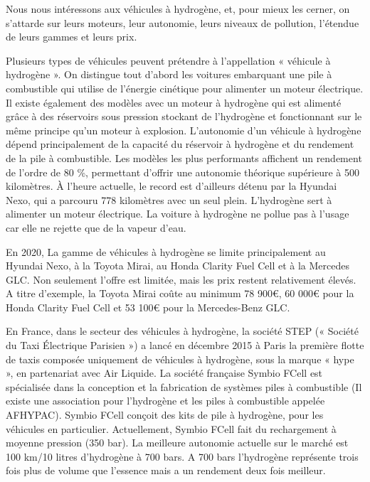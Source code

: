  Nous nous intéressons aux véhicules à hydrogène, et, pour mieux les cerner, on s'attarde sur leurs moteurs, leur autonomie, leurs niveaux de pollution, l'étendue de leurs gammes et leurs prix.
 
 Plusieurs types de véhicules peuvent prétendre à l'appellation « véhicule à hydrogène ». On distingue tout d'abord les voitures embarquant une pile à combustible qui utilise de l'énergie cinétique pour alimenter un moteur électrique. Il existe également des modèles avec un moteur à hydrogène qui est alimenté grâce à des réservoirs sous pression stockant de l'hydrogène et fonctionnant sur le même principe qu'un moteur à explosion.
 L'autonomie d'un véhicule à hydrogène dépend principalement de la capacité du réservoir à hydrogène et du rendement de la pile à combustible. Les modèles les plus performants affichent un rendement de l'ordre de 80 \%, permettant d'offrir une autonomie théorique supérieure à 500 kilomètres. À l'heure actuelle, le record est d'ailleurs détenu par la Hyundai Nexo, qui a parcouru 778 kilomètres avec un seul plein.
 L'hydrogène sert à alimenter un moteur électrique.
La voiture à hydrogène ne pollue pas à l'usage car elle ne rejette que de la vapeur d'eau.
 
  En 2020, La gamme de véhicules à hydrogène se limite principalement au Hyundai Nexo, à la Toyota Mirai, au Honda Clarity Fuel Cell et à la Mercedes GLC.
 Non seulement l'offre est limitée, mais les prix restent relativement élevés. A titre d'exemple, la Toyota Mirai coûte au minimum 78 900\euro{}, 60 000\euro{} pour la Honda Clarity Fuel Cell et 53 100\euro{} pour la Mercedes-Benz GLC.
 
 En France, dans le secteur des véhicules à hydrogène, la société
 STEP (« Société du Taxi Électrique Parisien ») a lancé en décembre 2015 à Paris la première flotte de taxis composée uniquement de véhicules à hydrogène, sous la marque « hype », en partenariat avec 
 Air Liquide. La société française  Symbio FCell est spécialisée dans la conception et la fabrication de systèmes piles à combustible (Il existe une association pour l'hydrogène et les piles à combustible appelée %
 AFHYPAC). Symbio FCell conçoit des kits de pile à hydrogène, pour les véhicules en particulier. Actuellement, Symbio FCell fait du rechargement à moyenne pression (350 bar).
 La meilleure autonomie actuelle sur le marché est 100 km/10 litres d'hydrogène à 700 bars.  A 700 bars l'hydrogène représente trois fois plus de volume que l'essence mais a un rendement deux fois meilleur.
 
